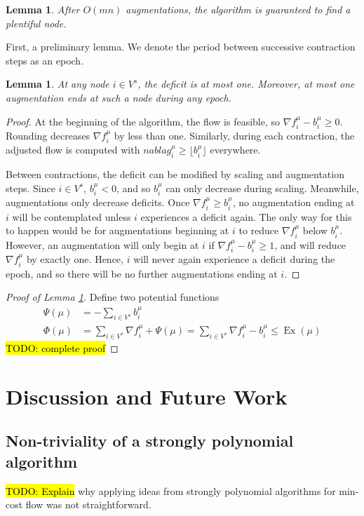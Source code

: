 \documentclass[11pt]{article}
\newtheorem{lemma}[theorem]{Lemma}
\theoremstyle{definition}
\theoremstyle{definition}
\newcommand{\fu}{f^{\mu}}
\newcommand{\nfiu}{\nabla \fu_i}
\newcommand{\biu}{b_{i}^{\mu}}
\newcommand{\vsrc}{V^{s}}
\DeclareMathOperator{\Ex}{Ex}
\newcommand{\todo}[1]{\hl{TODO: #1}}
\begin{document}
    \begin{lemma} \label{lem.num-aug}
        After $O(mn)$ augmentations, the algorithm is guaranteed to find a plentiful node.
    \end{lemma}
    First, a preliminary lemma. We denote the period between successive contraction
    steps as an epoch.
    \begin{lemma}
    At any node $i \in \vsrc$, the deficit is at most one. Moreover, at most one augmentation
    ends at such a node during any epoch.
    \end{lemma}
    \begin{proof}
        At the beginning of the algorithm, the flow is feasible, so $\nfiu - \biu \geq 0$.
        Rounding decreases $\nfiu$ by less than one. Similarly, during each contraction,
        the adjusted flow is computed with $nabla g_i^\mu \geq \lfloor \biu \rfloor$ everywhere.

        Between contractions, the deficit can be modified by scaling and augmentation steps.
        Since $i \in \vsrc$, $\biu < 0$, and so $\biu$ can only decrease during scaling.
        Meanwhile, augmentations only decrease deficits.
        Once $\nfiu \geq \biu$, no augmentation ending at $i$ will be contemplated unless $i$
        experiences a deficit again. The only way for this to happen would be for
        augmentations beginning at $i$ to reduce $\nfiu$ below $\biu$. However,
        an augmentation will only begin at $i$ if
        $\nfiu - \biu \geq 1$, and will reduce $\nfiu$ by exactly one. Hence, $i$ will
        never again experience a deficit during the epoch, and so there will be no further
        augmentations ending at $i$.
    \end{proof}

    \begin{proof}[Proof of Lemma \ref{lem.num-aug}]
    Define two potential functions
    \begin{align*}
    \Psi(\mu) &= - \sum_{i \in \vsrc} \biu \\
    \Phi(\mu) &= \sum_{i \in \vsrc} \nfiu + \Psi(\mu) = \sum_{i \in \vsrc} \nfiu - \biu
               \leq \Ex(\mu)
    \end{align*}
    \todo{complete proof}
    \end{proof}


\section{Discussion and Future Work}\label{sec:discussion}

	\subsection{Non-triviality of a strongly polynomial algorithm}

	\todo{Explain} why applying ideas from strongly polynomial algorithms for
	min-cost flow was not straightforward. 

\setlength{\bibitemsep}{0pt}
\nocite{*}
\printbibliography
\end{document}
